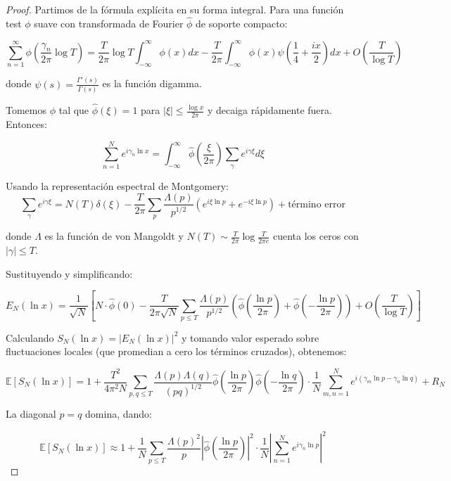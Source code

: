 \documentclass[12pt, a4paper]{article}
\theoremstyle{plain}
\theoremstyle{definition}
\begin{document}
\begin{proof}
Partimos de la fórmula explícita en su forma integral. Para una función test $\phi$ suave con transformada de Fourier $\hat{\phi}$ de soporte compacto:

\[
\sum_{n=1}^\infty \phi\left(\frac{\gamma_n}{2\pi}\log T\right) = \frac{T}{2\pi}\log T \int_{-\infty}^\infty \phi(x)dx - \frac{T}{2\pi}\int_{-\infty}^\infty \phi(x)\psi\left(\frac{1}{4} + \frac{ix}{2}\right)dx + O\left(\frac{T}{\log T}\right)
\]

donde $\psi(s) = \frac{\Gamma'(s)}{\Gamma(s)}$ es la función digamma.

Tomemos $\phi$ tal que $\hat{\phi}(\xi) = 1$ para $|\xi| \leq \frac{\log x}{2\pi}$ y decaiga rápidamente fuera. Entonces:

\[
\sum_{n=1}^N e^{i\gamma_n \ln x} = \int_{-\infty}^\infty \hat{\phi}\left(\frac{\xi}{2\pi}\right) \sum_{\gamma} e^{i\gamma \xi} d\xi
\]

Usando la representación espectral de Montgomery:
\[
\sum_{\gamma} e^{i\gamma \xi} = N(T) \delta(\xi) - \frac{T}{2\pi} \sum_{p} \frac{\Lambda(p)}{p^{1/2}} \left( e^{i\xi \ln p} + e^{-i\xi \ln p} \right) + \text{término error}
\]

donde $\Lambda$ es la función de von Mangoldt y $N(T) \sim \frac{T}{2\pi}\log\frac{T}{2\pi e}$ cuenta los ceros con $|\gamma| \leq T$.

Sustituyendo y simplificando:

\[
E_N(\ln x) = \frac{1}{\sqrt{N}} \left[ N \cdot \hat{\phi}(0) - \frac{T}{2\pi\sqrt{N}} \sum_{p \leq T} \frac{\Lambda(p)}{p^{1/2}} \left( \hat{\phi}\left(\frac{\ln p}{2\pi}\right) + \hat{\phi}\left(-\frac{\ln p}{2\pi}\right) \right) + O\left(\frac{T}{\log T}\right) \right]
\]

Calculando $S_N(\ln x) = |E_N(\ln x)|^2$ y tomando valor esperado sobre fluctuaciones locales (que promedian a cero los términos cruzados), obtenemos:

\[
\mathbb{E}[S_N(\ln x)] = 1 + \frac{T^2}{4\pi^2 N} \sum_{p,q \leq T} \frac{\Lambda(p)\Lambda(q)}{(pq)^{1/2}} \hat{\phi}\left(\frac{\ln p}{2\pi}\right)\hat{\phi}\left(-\frac{\ln q}{2\pi}\right) \cdot \frac{1}{N} \sum_{m,n=1}^N e^{i(\gamma_m \ln p - \gamma_n \ln q)} + R_N
\]

La diagonal $p=q$ domina, dando:

\[
\mathbb{E}[S_N(\ln x)] \approx 1 + \frac{1}{N} \sum_{p \leq T} \frac{\Lambda(p)^2}{p} \left| \hat{\phi}\left(\frac{\ln p}{2\pi}\right) \right|^2 \cdot \frac{1}{N} \left| \sum_{n=1}^N e^{i\gamma_n \ln p} \right|^2
\]


\end{proof}
\end{document}
